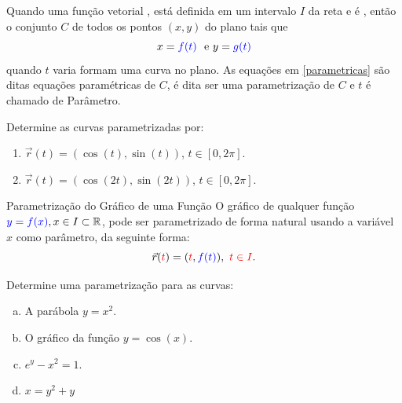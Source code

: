 
Quando uma função vetorial , está definida em um intervalo $I$ da reta e  é , então o conjunto {\color{red}$C$} de todos os pontos $(x,y)$ do plano tais que
\begin{equation}\label{parametricas}
x={\color{blue}f(t)}\ \text{ e } y={\color{blue}g(t)}
\end{equation}
quando $t$ varia formam uma {\color{red}curva no plano}. As equações em  {\color{red} \eqref{parametricas}} são ditas {\color{red} equações paramétricas de $C$},  é dita ser uma {\color{red}parametrização de $C$} e $t$ é chamado de  {\color{red} Parâmetro}.
\begin{exeb}{}{}
Determine as curvas parametrizadas por:
\begin{enumerate}
\item $\vec{r}(t)=(\cos(t),\sin(t))$, $t\in [0,2\pi]$.
\item $\vec{r}(t)=(\cos(2t),\sin(2t))$, $t\in [0,2\pi]$.

\end{enumerate}
\end{exeb}

\newpage


\begin{caixaazul}{Parametrização do Gráfico de uma Função}
O gráfico de qualquer função ${\color{blue}y=f(x)}, x\in I\subset\mathbb{R}$, pode ser parametrizado de forma natural usando a variável {\color{red}$x$ como parâmetro}, da seguinte forma:
\[\vec{r}({\color{red}t})=({\color{red}t},{\color{blue}f(t)}),\ {\color{red}t\in I}.\]
\end{caixaazul}

\begin{exeb}{}{}
 Determine uma parametrização para as curvas:
\begin{enumerate}[(a)]
\item A parábola $y=x^2$.
\item O gráfico da função \(y=\cos(x)\).
\item \(e^y-x^2=1\).
\item \(x=y^2+y\)
\end{enumerate}
\end{exeb}
\newpage




